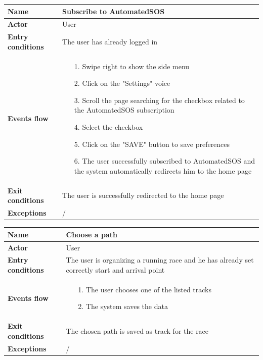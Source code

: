 \begin{table}[]
\begin{adjustbox}{width=\textwidth}
\footnotesize
\begin{tabular}{|p{}|p{}|}
\hline
\textbf{Name}             &  Subscribe to AutomatedSOS\\ \hline
\textbf{Actor}            &  User\\ \hline
\textbf{Entry conditions} &  The user has already logged in\\ \hline
\textbf{Events flow}      &
	\begin{itemize}
		\item[1.] Swipe right to show the side menu
		\item[2.] Click on the "Settings" voice
		\item[3.] Scroll the page searching for the checkbox related to the AutomatedSOS subscription
		\item[4.] Select the checkbox
		\item[5.] Click on the "SAVE" button to save preferences
		\item[6.] The user successfully subscribed to AutomatedSOS and the system automatically redirects him to the home page
	\end{itemize}\\ \hline
\textbf{Exit conditions}  &  The user is successfully redirected to the home page\\ \hline
\textbf{Exceptions}       &  /\\ \hline
\end{tabular}
\end{adjustbox}
\end{table}

\begin{table}[]
\begin{adjustbox}{width=\textwidth}
\footnotesize
\begin{tabular}{|p{}|p{}|}
\hline
\textbf{Name}             &  Choose a path\\ \hline
\textbf{Actor}            &  User\\ \hline
\textbf{Entry conditions} &  The user is organizing a running race and he has already set correctly start and arrival point\\ \hline
\textbf{Events flow}      &
	\begin{itemize}
		\item[1.] The user chooses one of the listed tracks
		\item[2.] The system saves the data
	\end{itemize}\\ \hline
\textbf{Exit conditions}  &  The chosen path is saved as track for the race\\ \hline
\textbf{Exceptions}       &  /\\ \hline
\end{tabular}
\end{adjustbox}
\end{table}

